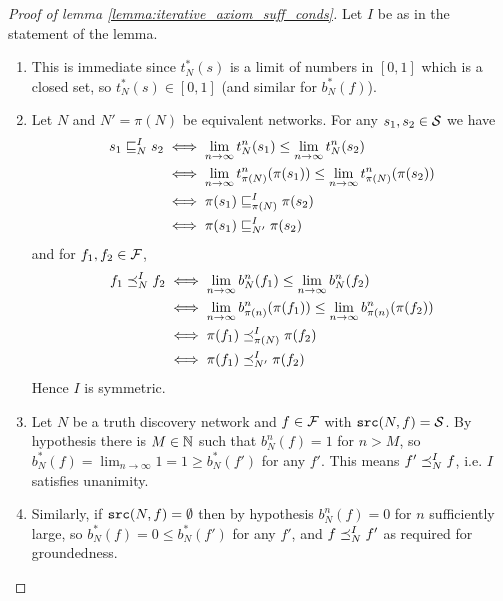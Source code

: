 \documentclass[../main.tex]{subfiles}
\begin{document}
\begin{proof}[Proof of lemma \ref{lemma:iterative_axiom_suff_conds}]
Let $I$ be as in the statement of the lemma.

\begin{enumerate}

\item This is immediate since $t_N^*(s)$ is a limit of numbers in $[0, 1]$
which is a closed set, so $t_N^*(s) \in [0, 1]$ (and similar for $b_N^*(f)$).

\item Let $N$ and $N' = \pi(N)$ be equivalent networks.  For any $s_1, s_2 \in
\S$ we have
\begin{align*}
    s_1 \sle_N^I s_2
        & \iff \lim_{n \rightarrow \infty}{t_N^n(s_1)} \le
            \lim_{n \rightarrow \infty}{t_N^n(s_2)} \\
        & \iff \lim_{n \rightarrow \infty}{t_{\pi(N)}^n(\pi(s_1))} \le
            \lim_{n \rightarrow \infty}{t_{\pi(N)}^n(\pi(s_2))} \\
        & \iff \pi(s_1) \sle_{\pi(N)}^I \pi(s_2) \\
        & \iff \pi(s_1) \sle_{N'}^I \pi(s_2)
\end{align*}
and for $f_1, f_2 \in \F$,
\begin{align*}
    f_1 \fle_N^I f_2
        & \iff \lim_{n \rightarrow \infty}{b_N^n(f_1)} \le
            \lim_{n \rightarrow \infty}{b_N^n(f_2)} \\
        & \iff \lim_{n \rightarrow \infty}{b_{\pi(n)}^n(\pi(f_1))} \le
            \lim_{n \rightarrow \infty}{b_{\pi(n)}^n(\pi(f_2))} \\
        & \iff \pi(f_1) \fle_{\pi(N)}^I \pi(f_2) \\
        & \iff \pi(f_1) \fle_{N'}^I \pi(f_2)
\end{align*}
Hence $I$ is symmetric.

\item Let $N$ be a truth discovery network and $f \in \F$ with $\src(N, f) =
\S$. By hypothesis there is $M \in \Nat$ such that $b_N^n(f) = 1$ for $n > M$,
so $b_N^*(f)=\lim_{n \rightarrow \infty}{1} = 1 \ge b_N^*(f')$ for any $f'$.
This means $f' \fle_N^I f$, i.e. $I$ satisfies unanimity.

\item Similarly, if $\src(N, f) = \emptyset$ then by hypothesis $b_N^n(f) = 0$
for $n$ sufficiently large, so $b_N^*(f)=0 \le b_N^*(f')$ for any $f'$, and $f
\fle_N^I f'$ as required for groundedness.


\end{enumerate}
\end{proof}
\end{document}
